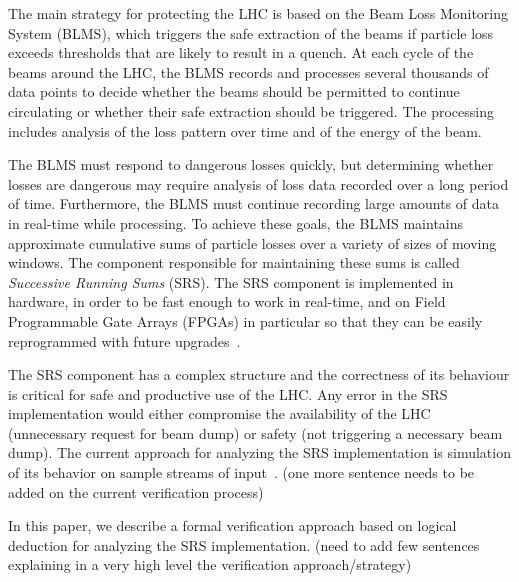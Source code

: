 \documentclass{llncs}
\begin{document}
The main strategy for protecting the LHC is based on the Beam Loss Monitoring System (BLMS), which triggers the safe extraction of the beams if particle loss exceeds thresholds that are likely to result in a quench.
At each cycle of the beams around the LHC, the BLMS records and processes several thousands of data points to decide whether the beams should be permitted to continue circulating or whether their safe extraction should be triggered.
The processing includes analysis of the loss pattern over time and of the energy of the beam.

The BLMS must respond to dangerous losses quickly, but determining whether losses are dangerous may require analysis of loss data recorded over a long period of time.
Furthermore, the BLMS must continue recording large amounts of data in real-time while processing.
To achieve these goals, the BLMS maintains approximate cumulative sums of particle losses over a variety of sizes of moving windows.
The component responsible for maintaining these sums is called \emph{Successive Running Sums} (SRS).
The SRS component is implemented in hardware, in order to be fast enough to work in real-time, and on Field Programmable Gate Arrays (FPGAs) in particular so that they can be easily reprogrammed with future upgrades~\cite{Chris-FPGA}.

The SRS component has a complex structure and the correctness of its behaviour is critical for safe and productive use of the LHC.
Any error in the SRS implementation would either compromise the availability of the LHC (unnecessary request for beam dump) or safety (not triggering a necessary beam dump).
The current approach for analyzing the SRS implementation is simulation of its behavior on sample streams of input~\cite{}.
(one more sentence needs to be added on the current verification process)

In this paper, we describe a formal verification approach based on logical deduction for analyzing the SRS implementation.
(need to add few sentences explaining in a very high level the verification approach/strategy)
\end{document}
